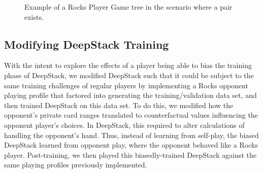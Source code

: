\documentclass{article}
\begin{document}
\begin{figure}[!b]
\begin{center}
\end{center}
   \caption{Example of a Rocks Player Game tree in the scenario where a pair exists.}
\label{fig:short}
\end{figure}

\subsection{Modifying DeepStack Training}
With the intent to explore the effects of a player being able to bias the training phase of DeepStack, we modified DeepStack such that it could be subject to the same training challenges of regular players by implementing a Rocks opponent playing profile that factored into generating the training/validation data set, and then trained DeepStack on this data set. To do this, we modified how the opponent’s private card ranges translated to counterfactual values influencing the opponent player’s choices. In DeepStack, this required %
to alter calculations of handling the opponent’s hand. Thus, instead of learning from self-play, the biased DeepStack learned from opponent play, where the opponent behaved like a Rocks player. Post-training, we then played this biasedly-trained DeepStack against the same playing profiles previously implemented. 
\end{document}
